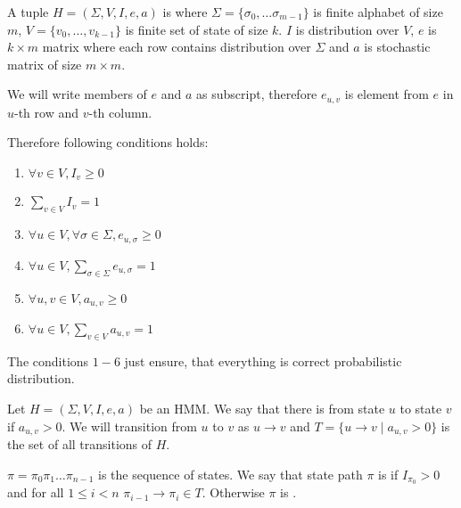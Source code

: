 \begin{definition}\label{DEF:HMM}
A tuple $H=(\Sigma,V,I,e,a)$ is  where
$\Sigma=\{\sigma_0,\dots\sigma_{m-1}\}$ is finite alphabet of size $m$,
$V=\{v_0,\dots,v_{k-1}\}$ is finite set of state of size $k$. $I$ is
distribution over $V$, $e$ is $k\times m$ matrix where each row contains
distribution over $\Sigma$ and $a$ is stochastic matrix of size $m\times m$.

We will write members of $e$ and $a$ as subscript, therefore $e_{u,v}$ is
element from $e$ in $u$-th row and $v$-th column.  

Therefore following conditions holds:
\begin{enumerate}
\item $\forall v\in V, I_v \geq 0$
\item $\sum_{v\in V}I_v=1$
\item $\forall u\in V,\forall \sigma\in\Sigma, e_{u,\sigma}\geq0$
\item $\forall u\in V, \sum_{\sigma\in \Sigma}e_{u,\sigma}=1$
\item $\forall u,v\in V, a_{u,v}\geq0$
\item $\forall u\in V, \sum_{v\in V}a_{u,v}=1$
\end{enumerate}
\end{definition}

The conditions $1-6$ just ensure, that everything is correct probabilistic
distribution.

\begin{example}
\end{example}

\begin{definition}\label{DEF:STATEPATH}
Let $H=(\Sigma,V,I,e,a)$ be an HMM.
We say that there is  from state $u$ to state $v$ if
$a_{u,v}>0$. We will transition from $u$ to $v$ as $u\to v$ and $T=\{u\to v\mid
a_{u,v}>0\}$ is the set of all transitions of $H$.

 $\pi=\pi_0\pi_1\dots\pi_{n-1}$ is the sequence of
states. We say that state path $\pi$ is  if $I_{\pi_0}>0$
and for all $1\leq i < n$ $\pi_{i-1}\to\pi_i\in T$. Otherwise $\pi$ is
.
\end{definition}

\begin{example}
\end{example}


